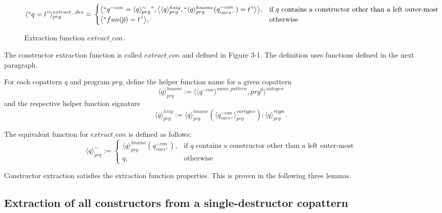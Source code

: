 \begin{figure}
\vspace{2.4in}
\[
    \langle `` q = t " \rangle^{extract\_des}_{prg} =\\
\begin{cases}
    \big\langle `` q^{-con} =  \langle q \rangle^{\sim}_{prg} ", \big\langle \langle q \rangle^{hsig}_{prg}, `` \langle q \rangle^{hname}_{prg}(q^{-con}_{vars^-}) = t  " \big\rangle \big\rangle,& \text{if $q$ contains a constructor other than a left outer-most} \\
   \big\langle `` fun(\overline{p}) = t " \big\rangle,& \text{otherwise}
\end{cases}
\]
\caption{Extraction function $extract\_con$.}
\end{figure}

The constructor extraction function is called $extract\_con$ and defined in Figure 3-1. The definition uses functions defined in the next paragraph.

For each copattern $q$ and program $prg$, define the helper function name for a given copattern
\begin{equation*}
\langle q \rangle^{hname}_{prg} := \langle \langle q^{-con} \rangle^{name\_pattern}, prg^0 \rangle^{autogen}
\end{equation*}
and the respective helper function signature
\begin{equation*}
\langle q \rangle^{hsig}_{prg} := \langle q \rangle^{hname}_{prg}(\langle q^{-con}_{vars^+} \rangle^{vartypes}_{prg}): \langle q \rangle^{rtype}_{prg}.
\end{equation*}

The equivalent function for $extract\_con$ is defined as follows:
\[
    \langle q \rangle^{\sim}_{prg} :=
\begin{cases}
    \langle q \rangle^{hname}_{prg}(q^{-con}_{vars^+}),& \text{if $q$ contains a constructor other than a left outer-most} \\
    q,                                                                                      & \text{otherwise}
\end{cases}
\]

Constructor extraction satisfies the extraction function properties. This is proven in the following three lemmas.

\subsection{Extraction of all constructors from a single-destructor copattern}

